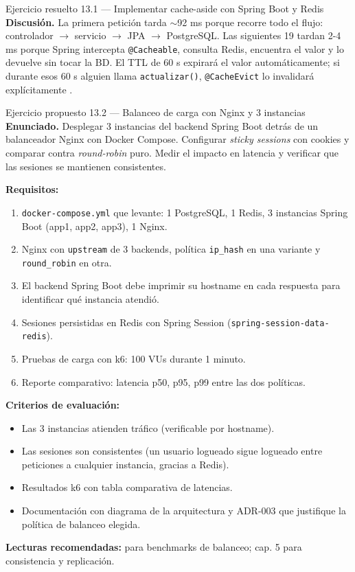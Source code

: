 \begin{cajaejemplo}{Ejercicio resuelto 13.1 --- Implementar cache-aside con Spring Boot y Redis}
\textbf{Discusión.} La primera petición tarda $\sim$92 ms porque
recorre todo el flujo: controlador $\to$ servicio $\to$ JPA $\to$
PostgreSQL. Las siguientes 19 tardan 2-4 ms porque Spring intercepta
\texttt{@Cacheable}, consulta Redis, encuentra el valor y lo devuelve
sin tocar la BD. El TTL de 60 s expirará el valor automáticamente; si
durante esos 60 s alguien llama \texttt{actualizar()},
\texttt{@CacheEvict} lo invalidará explícitamente
\cite{kleppmann2017designing}.
\end{cajaejemplo}

\begin{cajaejercicio}{Ejercicio propuesto 13.2 --- Balanceo de carga con Nginx y 3 instancias}
\textbf{Enunciado.} Desplegar 3 instancias del backend Spring Boot
detrás de un balanceador Nginx con Docker Compose. Configurar
\emph{sticky sessions} con cookies y comparar contra
\emph{round-robin} puro. Medir el impacto en latencia y verificar
que las sesiones se mantienen consistentes.

\textbf{Requisitos:}
\begin{enumerate}
\item \texttt{docker-compose.yml} que levante: 1 PostgreSQL,
1 Redis, 3 instancias Spring Boot (app1, app2, app3), 1 Nginx.
\item Nginx con \texttt{upstream} de 3 backends, política
\texttt{ip\_hash} en una variante y \texttt{round\_robin} en otra.
\item El backend Spring Boot debe imprimir su hostname en cada
respuesta para identificar qué instancia atendió.
\item Sesiones persistidas en Redis con Spring Session
(\texttt{spring-session-data-redis}).
\item Pruebas de carga con k6: 100 VUs durante 1 minuto.
\item Reporte comparativo: latencia p50, p95, p99 entre las dos
políticas.
\end{enumerate}

\textbf{Criterios de evaluación:}
\begin{itemize}
\item Las 3 instancias atienden tráfico (verificable por hostname).
\item Las sesiones son consistentes (un usuario logueado sigue
logueado entre peticiones a cualquier instancia, gracias a Redis).
\item Resultados k6 con tabla comparativa de latencias.
\item Documentación con diagrama de la arquitectura y ADR-003 que
justifique la política de balanceo elegida.
\end{itemize}

\textbf{Lecturas recomendadas:}
\cite{kleppmann2017designing} para benchmarks de balanceo;
\cite{kleppmann2017designing} cap. 5 para consistencia y replicación.
\end{cajaejercicio}

